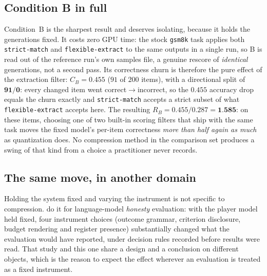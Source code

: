 \subsection{Condition B in full}
\label{app:sensitivity:condB}

Condition~B is the sharpest result and deserves isolating, because it holds the
generations fixed. It costs zero GPU time: the stock \texttt{gsm8k} task applies
both \texttt{strict-match} and \texttt{flexible-extract} to the same outputs in a
single run, so B is read out of the reference run's own samples file, a genuine
rescore of \emph{identical} generations, not a second pass.
Its correctness churn is therefore the pure effect of the extraction filter:
$C_B = 0.455$ ($91$ of $200$ items), with a directional split of
$\textbf{91}/\textbf{0}$: every changed item went correct$\to$incorrect, so the
$0.455$ accuracy drop equals the churn exactly and \texttt{strict-match} accepts
a strict subset of what \texttt{flexible-extract} accepts here. The resulting
$R_B = 0.455/0.287 = \textbf{1.585}$: on these items, choosing one of two
built-in scoring filters that ship with the same task moves the fixed model's
per-item correctness \emph{more than half again as much} as quantization does.
No compression method in the comparison set produces a swing of that kind from a
choice a practitioner never records.

\subsection{The same move, in another domain}
\label{app:sensitivity:bronder}

Holding the system fixed and varying the instrument is not specific to
compression. \citet{bronder2026instrument} do it for language-model
\emph{honesty} evaluation: with the player model held fixed, four instrument
choices (outcome grammar, criterion disclosure, budget rendering and register
presence) substantially changed what the evaluation would have reported, under
decision rules recorded before results were read. That study and this one share
a design and a conclusion on different objects, which is the reason to expect
the effect wherever an evaluation is treated as a fixed instrument.

